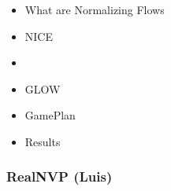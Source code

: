 \begin{frame}
\begin{itemize}
    \item What are Normalizing Flows
    \item NICE
    \item \textbf{\color{red}{RealNVP}}
    \item GLOW
    \item GamePlan
    \item Results
\end{itemize}
\end{frame}

\begin{frame}
    \frametitle{RealNVP (Luis)}
\end{frame}
